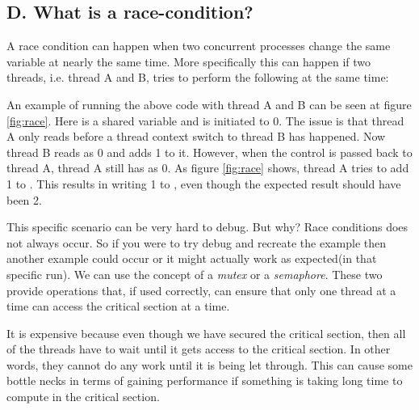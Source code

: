 \subsection{D. What is a race-condition?}
A race condition can happen when two concurrent processes change the same variable at nearly the same time. More specifically this can happen if two threads, i.e. thread A and B, tries to perform the following at the same time:
\begin{figure}[h]
    \centering
\end{figure}
An example of running the above code with thread A and B can be seen at figure \ref{fig:race}.
Here  is a shared variable and is initiated to 0. The issue is that thread A only reads  before a thread context switch to thread B has happened. Now thread B reads  as 0 and adds 1 to it. However, when the control is passed back to thread A, thread A still has  as 0. As figure \ref{fig:race} shows, thread A tries to add 1 to . This results in writing 1 to , even though the expected result should have been 2. 

This specific scenario can be very hard to debug. But why? Race conditions does not always occur. So if you were to try debug and recreate the example then another example could occur or it might actually work as expected(in that specific run).
We can use the concept of a \textit{mutex} or a \textit{semaphore}. These two provide operations that, if used correctly, can ensure that 
only one thread at a time can access the critical section at a time. 

It is expensive because even though we have secured the critical section, then all of the threads have to wait until it gets access to
the critical section. In other words, they cannot do any work until it is being let through. This can cause some bottle necks in terms of 
gaining performance if something is taking long time to compute in the critical section.
